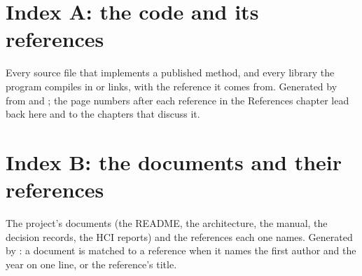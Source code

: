 \documentclass[11pt, twoside, openany]{book}
\begin{document}
\tableofcontents
\listoffigures

\mainmatter














\backmatter

\chapter{Index A: the code and its references}
\label{ch:indexA}
Every source file that implements a published method, and every library the program compiles in or links, with the
reference it comes from. Generated by  from  and
; the page numbers after each reference in the References chapter lead back here and to the
chapters that discuss it.

\chapter{Index B: the documents and their references}
\label{ch:indexB}
The project's documents (the README, the architecture, the manual, the decision records, the HCI reports) and the
references each one names. Generated by : a document is matched to a reference when it
names the first author and the year on one line, or the reference's title.


\end{document}
